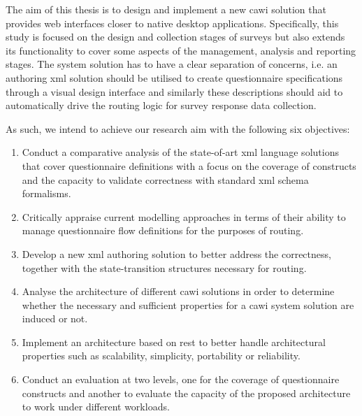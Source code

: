 	The aim of this thesis is to design and implement a new \gls{cawi} solution that provides web interfaces closer to native desktop applications. Specifically, this study is focused on the design and collection stages of surveys but also extends its functionality to cover some aspects of the management, analysis and reporting stages. The system solution has to have a clear separation of concerns, i.e. an authoring \gls{xml} solution should be utilised to create questionnaire specifications through a visual design interface and similarly these descriptions should aid to automatically drive the routing logic for survey response data collection.


	As such, we intend to achieve our research aim with the following six objectives:

	\begin{enumerate}
		\item Conduct a comparative analysis of the state-of-art \gls{xml} language solutions that cover questionnaire definitions with a focus on the coverage of constructs and the capacity to validate correctness with standard \gls{xml} schema formalisms.
		\item Critically appraise current modelling approaches in terms of their ability to manage questionnaire flow definitions for the purposes of routing.
		\item Develop a new \gls{xml} authoring solution to better address the correctness, together with the state-transition structures necessary for routing.
		\item Analyse the architecture of different \gls{cawi} solutions in order to determine whether the necessary and sufficient properties for a \gls{cawi} system solution are induced or not. 
		\item Implement an architecture based on \gls{rest} to better handle architectural properties such as scalability, simplicity, portability or reliability.
		\item Conduct an evaluation at two levels, one for the coverage of questionnaire constructs and another to evaluate the capacity of the proposed architecture to work under different workloads.
	\end{enumerate}